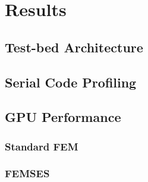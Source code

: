 \clearpage
\chapter{Results}

\section{Test-bed Architecture}

\section{Serial Code Profiling}

\section{GPU Performance}

\subsection{Standard FEM}

\subsection{FEMSES}